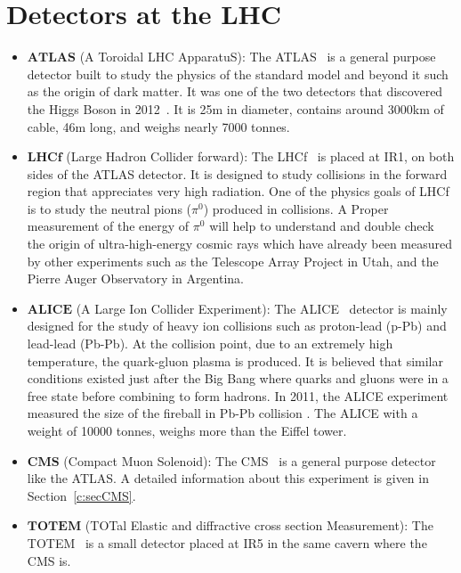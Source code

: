 \section{Detectors at the LHC}
\begin{itemize}[leftmargin=*]		
	\item $\textbf{ATLAS}$ (A Toroidal LHC ApparatuS):  The 
	ATLAS~\cite{Collaboration_2008_ATLAS} is a general purpose
	detector built to study the physics of the standard model and beyond it such
	as the origin of dark matter. It was one of the two detectors that discovered the 
	Higgs Boson in 2012~\cite{Aad:2012tfa}. It is 25\unit{m} in diameter, 
	contains around 3000\unit{km} of cable, 46\unit{m} long, and weighs nearly 7000 tonnes.
\item $\textbf{LHCf}$ (Large Hadron Collider forward): The 
	LHCf~\cite{Collaboration_2008_LHCf} is placed at IR1, 
	on both sides of the ATLAS detector. It is designed to study collisions in the 
	forward region that appreciates very high radiation. 
	One of the physics goals of LHCf is to study the neutral pions ($\pi^0$) produced in 
	collisions. A Proper measurement of the energy of $\pi^0$ will help to understand and double
	check the origin of ultra-high-energy cosmic rays which have already been 
	measured by other experiments such as the Telescope Array Project in Utah,
	and the Pierre Auger Observatory in Argentina.
\item $\textbf{ALICE}$ (A Large Ion Collider Experiment): 
	The ALICE~\cite{Collaboration_2008_ALICE} detector is mainly designed
	for the study of heavy ion collisions such as proton-lead (p-Pb) and lead-lead 
	(Pb-Pb). At the collision point, due to an extremely high temperature, the 
	quark-gluon plasma is produced. It is believed that similar conditions existed 
	just after the Big Bang where quarks and gluons were in a free state before 
	combining to form hadrons. In 2011, the ALICE experiment measured the size of
	the fireball in Pb-Pb collision \cite{Aamodt:2011mr}. The ALICE with a weight 
	of 10000 tonnes, weighs more than the Eiffel tower.
\item $\textbf{CMS}$ (Compact Muon Solenoid): The CMS~\cite{Collaboration_2008_CMS} 
	is a general purpose detector 
	like the ATLAS. A detailed information about this experiment is given in
	Section~\ref{c:secCMS}.
\item $\textbf{TOTEM}$ (TOTal Elastic and diffractive cross section Measurement): The
	TOTEM~\cite{Collaboration_2008_TOTEM} is a small detector placed at IR5 in the 
	same cavern where the CMS is.

\end{itemize}
